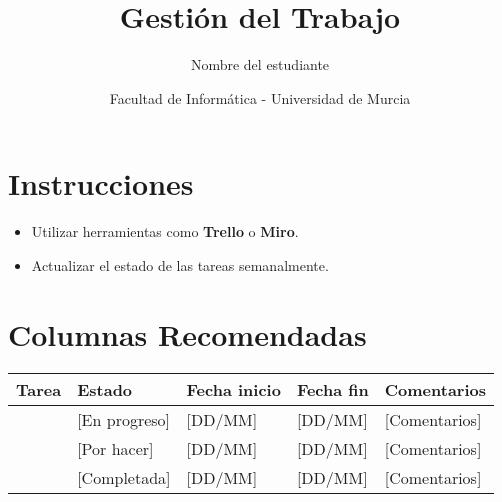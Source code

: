 \documentclass[12pt, a4paper]{article}
\title{\textbf{Gestión del Trabajo}}
\author{Nombre del estudiante}
\date{Facultad de Informática - Universidad de Murcia}
\begin{document}
\maketitle

\section*{Instrucciones}
\begin{itemize}
    \item Utilizar herramientas como \textbf{Trello} o \textbf{Miro}.
    \item Actualizar el estado de las tareas semanalmente.
\end{itemize}

\section*{Columnas Recomendadas}
\begin{tabular}{|l|l|l|l|l|}
    \hline
    \textbf{Tarea} & \textbf{Estado} & \textbf{Fecha inicio} & \textbf{Fecha fin} & \textbf{Comentarios} \\ \hline
    [Tarea 1] & [En progreso] & [DD/MM] & [DD/MM] & [Comentarios] \\ \hline
    [Tarea 2] & [Por hacer] & [DD/MM] & [DD/MM] & [Comentarios] \\ \hline
    [Tarea 3] & [Completada] & [DD/MM] & [DD/MM] & [Comentarios] \\ \hline
\end{tabular}
\end{document}
